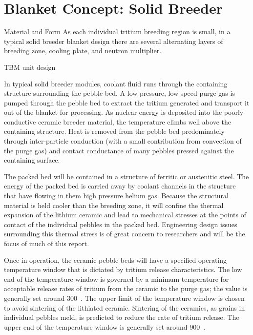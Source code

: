 \section{Blanket Concept: Solid Breeder}\label{sec:blanket-design}

Material and Form
As each individual tritium breeding region is small, in a typical solid breeder blanket design there are several alternating layers of breeding zone, cooling plate, and neutron multiplier. 



TBM unit design

In typical solid breeder modules, coolant fluid runs through the containing structure surrounding the pebble bed. A low-pressure, low-speed purge gas is pumped through the pebble bed to extract the tritium generated and transport it out of the blanket for processing. As nuclear energy is deposited into the poorly-conductive ceramic breeder material, the temperature climbs well above the containing structure. Heat is removed from the pebble bed predominately through inter-particle conduction (with a small contribution from convection of the purge gas) and contact conductance of many pebbles pressed against the containing surface. 

The packed bed will be contained in a structure of ferritic or austenitic steel. The energy of the packed bed is carried away by coolant channels in the structure that have flowing in them high pressure helium gas. Because the structural material is held cooler than the breeding zone, it will confine the thermal expansion of the lithium ceramic and lead to mechanical stresses at the points of contact of the individual pebbles in the packed bed. Engineering design issues surrounding this thermal stress is of great concern to researchers and will be the focus of much of this report.

Once in operation, the ceramic pebble beds will have a specified operating temperature window that is dictated by tritium release characteristics. The low end of the temperature window is governed by a minimum temperature for acceptable release rates of tritium from the ceramic to the purge gas; the value is generally set around 300~\celsius. The upper limit of the temperature window is chosen to avoid sintering of the lithiated ceramic. Sintering of the ceramics, as grains in individual pebbles meld, is predicted to reduce the rate of tritium release. The upper end of the temperature window is generally set around 900~\celsius.

